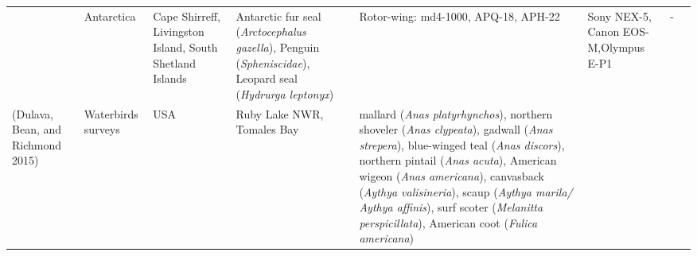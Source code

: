 \documentclass[]{interact}
\theoremstyle{plain}%
\theoremstyle{definition}
\theoremstyle{remark}
\begin{document}
\begin{longtable}[]{@{}llllllll@{}}
\begin{minipage}[t]{0.18\columnwidth}
\end{minipage} & \begin{minipage}[t]{0.03\columnwidth}\raggedright\strut
Antarctica\strut
\end{minipage} & \begin{minipage}[t]{0.14\columnwidth}\raggedright\strut
Cape Shirreff, Livingston Island, South Shetland Islands\strut
\end{minipage} & \begin{minipage}[t]{0.10\columnwidth}\raggedright\strut
Antarctic fur seal (\emph{Arctocephalus gazella}), Penguin
(\emph{Spheniscidae}), Leopard seal (\emph{Hydrurga leptonyx})\strut
\end{minipage} & \begin{minipage}[t]{0.09\columnwidth}\raggedright\strut
Rotor-wing: md4-1000, APQ-18, APH-22\strut
\end{minipage} & \begin{minipage}[t]{0.11\columnwidth}\raggedright\strut
Sony NEX-5, Canon EOS-M,Olympus E-P1\strut
\end{minipage} & \begin{minipage}[t]{0.01\columnwidth}\raggedright\strut
-\strut
\end{minipage}\tabularnewline
\begin{minipage}[t]{0.11\columnwidth}\raggedright\strut
(Dulava, Bean, and Richmond 2015)\strut
\end{minipage} & \begin{minipage}[t]{0.18\columnwidth}\raggedright\strut
Waterbirds surveys\strut
\end{minipage} & \begin{minipage}[t]{0.03\columnwidth}\raggedright\strut
USA\strut
\end{minipage} & \begin{minipage}[t]{0.14\columnwidth}\raggedright\strut
Ruby Lake NWR, Tomales Bay\strut
\end{minipage} & \begin{minipage}[t]{0.10\columnwidth}\raggedright\strut
mallard (\emph{Anas platyrhynchos}), northern shoveler (\emph{Anas
clypeata}), gadwall (\emph{Anas strepera}), blue-winged teal (\emph{Anas
discors}), northern pintail (\emph{Anas acuta}), American wigeon
(\emph{Anas americana}), canvasback (\emph{Aythya valisineria}), scaup
(\emph{Aythya marila/ Aythya affinis}), surf scoter (\emph{Melanitta
perspicillata}), American coot (\emph{Fulica americana})\strut
\end{minipage} & \begin{minipage}[t]{0.09\columnwidth}\raggedright\strut

\end{minipage}
\end{longtable}
\end{document}

